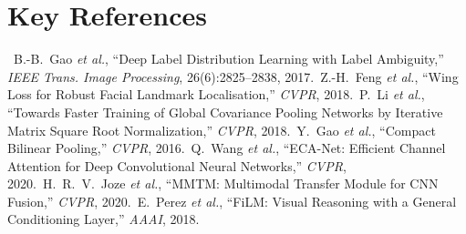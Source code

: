 \documentclass[9pt,letterpaper]{extarticle}
\begin{document}
\section*{Key References}
\begin{footnotesize}
\setlength{\parskip}{0pt}
\noindent
[1]~B.-B.~Gao \emph{et al.}, ``Deep Label Distribution Learning with Label
Ambiguity,'' \emph{IEEE Trans. Image Processing}, 26(6):2825--2838, 2017.\;
[2]~Z.-H.~Feng \emph{et al.}, ``Wing Loss for Robust Facial Landmark
Localisation,'' \emph{CVPR}, 2018.\;
[3]~P.~Li \emph{et al.}, ``Towards Faster Training of Global Covariance Pooling
Networks by Iterative Matrix Square Root Normalization,'' \emph{CVPR}, 2018.\;
[4]~Y.~Gao \emph{et al.}, ``Compact Bilinear Pooling,'' \emph{CVPR}, 2016.\;
[5]~Q.~Wang \emph{et al.}, ``ECA-Net: Efficient Channel Attention for Deep
Convolutional Neural Networks,'' \emph{CVPR}, 2020.\;
[6]~H.~R.~V.~Joze \emph{et al.}, ``MMTM: Multimodal Transfer Module for CNN
Fusion,'' \emph{CVPR}, 2020.\;
[7]~E.~Perez \emph{et al.}, ``FiLM: Visual Reasoning with a General Conditioning
Layer,'' \emph{AAAI}, 2018.
\end{footnotesize}
\end{document}
